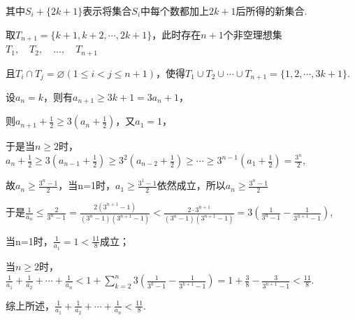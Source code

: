 \documentclass[11pt,a4paper]{ctexart}
\begin{document}
其中\(S_{i}+\{2k+1\}\)表示将集合\(S_{i}\)中每个数都加上\(2k+1\)后所得的新集合.

取\(T_{n+1}=\{k+1,k+2,\cdots,2k+1\}\)，此时存在\(n+1\)个非空理想集\(T_{1},\quad T_{2},\quad\ldots,\quad T_{n+1}\)

且\(T_{i}\cap T_{j}=\varnothing(1\leq i<j\leq n+1)\)，使得\(T_{1}\cup T_{2}\cup\cdots\cup T_{n+1}=\{1,2,\cdots,3k+1\}\).

设\(a_{n}=k\)，则有\(a_{n+1}\geq3k+1=3a_{n}+1\)，

则\(a_{n+1}+\frac{1}{2}\geq3\left(a_{n}+\frac{1}{2}\right)\)，又\(a_{1}=1\)，

于是当\(n\geq2\)时，\(a_{n}+\frac{1}{2}\geq3\left(a_{n-1}+\frac{1}{2}\right)\geq3^{2}\left(a_{n-2}+\frac{1}{2}\right)\geq\cdots\geq3^{n-1}\left(a_{1}+\frac{1}{2}\right)=\frac{3^{n}}{2},\)

故\(a_{n}\geq\frac{3^{n}-1}{2}\)，当n=1时，\(a_{1}\geq\frac{3^{1}-1}{2}\)依然成立，所以\(a_{n}\geq\frac{3^{n}-1}{2}\)

于是\(\frac{1}{a_{n}}\leq\frac{2}{3^{n}-1}=\frac{2(3^{n+1}-1)}{(3^{n}-1)(3^{n+1}-1)}<\frac{2\cdot3^{n+1}}{(3^{n}-1)(3^{n+1}-1)}=3\left(\frac{1}{3^{n}-1}-\frac{1}{3^{n+1}-1}\right)\),

当n=1时，\(\frac{1}{a_{1}}=1<\frac{11}{8}\)成立；

当\(n \geq 2\)时，\(\frac{1}{a_1} + \frac{1}{a_2} + \cdots + \frac{1}{a_n} < 1 + \sum_{k=2}^{n} 3\left(\frac{1}{3^k - 1} - \frac{1}{3^{k+1} - 1}\right) = 1 + \frac{3}{8} - \frac{3}{3^{n+1} - 1} < \frac{11}{8}\).

综上所述，\(\frac{1}{a_{1}}+\frac{1}{a_{2}}+\cdots+\frac{1}{a_{n}}<\frac{11}{8}.\)
\end{document}
